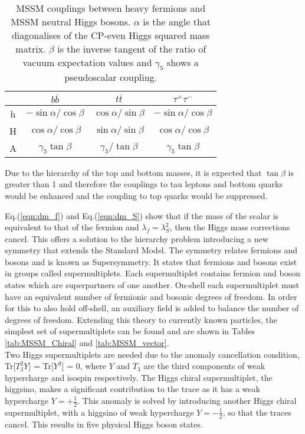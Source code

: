 \begin{table}[H]
\centering
\begin{tabular}{c || c c c}
\hline
  & $b\bar{b}$ & $t\bar{t}$ & $\tau^+ \tau^-$ \\
\hline
\hline
h & $-\sin\alpha / \cos\beta$ & $\cos\alpha / \sin\beta$ & $-\sin\alpha / \cos\beta$\\
H & $\cos\alpha / \cos\beta$ & $\sin\alpha / \sin\beta$ & $\cos\alpha / \cos\beta$ \\
A & $\gamma_{5}\tan\beta $ & $\gamma_{5}/\tan\beta$ & $\gamma_{5}\tan\beta$ \\
\hline
\end{tabular}
\caption{MSSM couplings between heavy fermions and MSSM neutral Higgs bosons. $\alpha$ is the angle that diagonalises of the CP-even Higgs squared mass matrix. $\beta$ is the inverse tangent of the ratio of vacuum expectation values and $\gamma_5$ shows a pseudoscalar coupling.}
\label{tab:mssm_couplings}
\end{table}

Due to the hierarchy of the top and bottom masses, it is expected that $\tan\beta$ is greater than 1 and therefore the couplings to tau leptons and bottom quarks would be enhanced and the coupling to top quarks would be suppressed.

Eq.(\ref{eqn:dm_f}) and Eq.(\ref{eqn:dm_S}) show that if the mass of the scalar is equivalent to that of the fermion and \(\lambda_f = \lambda_{S}^{2}\), then the Higgs mass corrections cancel. This offers a solution to the hierarchy problem introducing a new symmetry that extends the Standard Model. The symmetry relates fermions and bosons and is known as Supersymmetry. It states that fermions and bosons exist in groups called supermultiplets. Each supermultiplet contains fermion and boson states which are superpartners of one another. On-shell each supermultiplet must have an equivalent number of fermionic and bosonic degrees of freedom. In order for this to also hold off-shell, an auxiliary field is added to balance the number of degrees of freedom. Extending this theory to currently known particles, the simplest set of supermultiplets can be found and are shown in Tables \ref{tab:MSSM_Chiral} and \ref{tab:MSSM_vector}. \\

Two Higgs supermultiplets are needed due to the anomaly cancellation condition, Tr[\(T_{3}^{2}Y\)] = Tr[\(Y^3\)] = 0, where \(Y\) and \(T_3\) are the third components of weak hypercharge and isospin respectively. The Higgs chiral supermultiplet, the higgsino, makes a significant contribution to the trace as it has a weak hypercharge \(Y=+\frac{1}{2}\). This anomaly is solved by introducing another Higgs chiral supermultiplet, with a higgsino of weak hypercharge \(Y=-\frac{1}{2}\), so that the traces cancel. This results in five physical Higgs boson states. 

